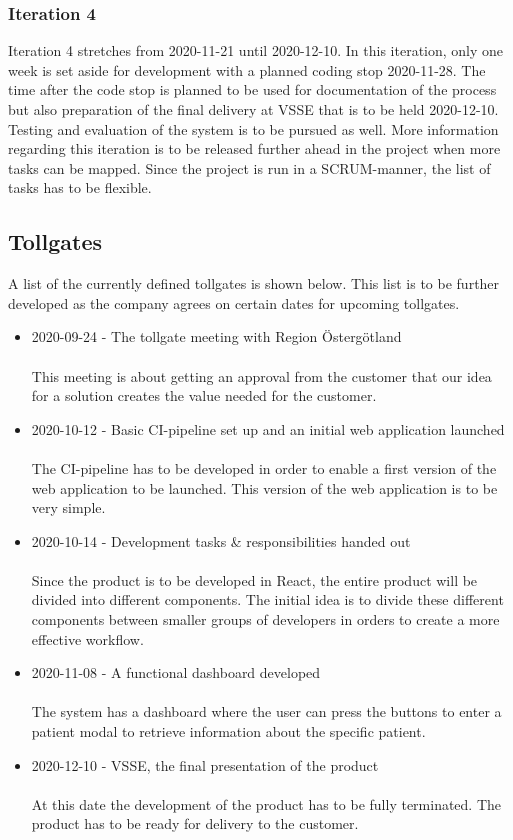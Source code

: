 \subsubsection{Iteration 4}
Iteration 4 stretches from 2020-11-21 until 2020-12-10. In this iteration, only one week is set aside for development with a planned coding stop 2020-11-28. The time after the code stop is planned to be used for documentation of the process but also preparation of the final delivery at VSSE that is to be held 2020-12-10. Testing and evaluation of the system is to be pursued as well. \vspace{5mm}
More information regarding this iteration is to be released further ahead in the project when more tasks can be mapped. Since the project is run in a SCRUM-manner, the list of tasks has to be flexible. 

\subsection{Tollgates}
A list of the currently defined tollgates is shown below. This list is to be further developed as the company agrees on certain dates for upcoming tollgates.
\begin{itemize}
    \item 2020-09-24 - The tollgate meeting with Region Östergötland\\ \\
    This meeting is about getting an approval from the customer that our idea for a solution creates the value needed for the customer. 
    \item 2020-10-12 - Basic CI-pipeline set up and an initial web application launched\\ \\
    The CI-pipeline has to be developed in order to enable a first version of the web application to be launched. This version of the web application is to be very simple. 
    \item 2020-10-14 - Development tasks \& responsibilities handed out \\ \\
    Since the product is to be developed in React, the entire product will be divided into different components. The initial idea is to divide these different components between smaller groups of developers in orders to create a more effective workflow.
    \item 2020-11-08 - A functional dashboard developed \\ \\
    The system has a dashboard where the user can press the buttons to enter a patient modal to retrieve information about the specific patient. 
    
    \item 2020-12-10 - VSSE, the final presentation of the product\\ \\
    At this date the development of the product has to be fully terminated. The product has to be ready for delivery to the customer. 
\end{itemize}   
